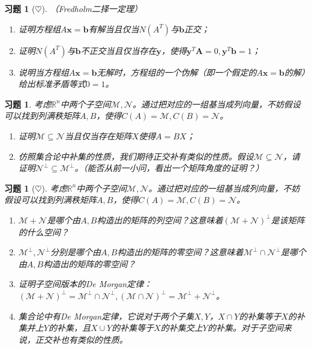 \documentclass[UTF8]{ctexart}
\newcommand{\Ker}{N}
\newtheorem{ex}[thm]{习题}
\begin{document}
\begin{ex}[$\heartsuit$]
（Fredholm二择一定理）
\begin{enumerate}
\item 证明方程组$A\bm x=\bm b$有解当且仅当$\Ker(A^T)$与$\bm b$正交；
\item 证明$\Ker(A^T)$与$\bm b$不正交当且仅当存在$\bm y$，使得$\bm y^T \bm A =0, \bm y^T \bm b =1$；
\item 说明当方程组$A\bm x=\bm b$无解时，方程组的一个伪解（即一个假定的$A\bm x=\bm b$的解）给出标准矛盾等式$0=1$。

\end{enumerate}
\end{ex}



\begin{ex}
考虑$\mathbb{R}^n$中两个子空间$\mathcal{M},\mathcal{N}$。通过把对应的一组基当成列向量，不妨假设可以找到列满秩矩阵$A,B$，使得$C(A)=\mathcal{M}, C(B)=\mathcal{N}$。
\begin{enumerate}
\item 证明$\mathcal{M}\subseteq\mathcal{N}$当且仅当存在矩阵$X$使得$A=BX$；
\item 仿照集合论中补集的性质，我们期待正交补有类似的性质。假设$\mathcal{M}\subseteq\mathcal{N}$，请证明$\mathcal{N}^\perp\subseteq\mathcal{M}^\perp$。（能否从前一小问，看出一个矩阵角度的证明？）
\end{enumerate}
\end{ex}



\begin{ex}[$\heartsuit $]
考虑$\mathbb{R}^n$中两个子空间$\mathcal{M},\mathcal{N}$。通过把对应的一组基当成列向量，不妨假设可以找到列满秩矩阵$A,B$，使得$C(A)=\mathcal{M}, C(B)=\mathcal{N}$。
\begin{enumerate}
\item $\mathcal{M}+\mathcal{N}$是哪个由$A,B$构造出的矩阵的列空间？这意味着$(\mathcal{M}+\mathcal{N})^\perp$是该矩阵的什么空间？
\item $\mathcal{M}^\perp,\mathcal{N}^\perp$分别是哪个由$A,B$构造出的矩阵的零空间？这意味着$\mathcal{M}^\perp\cap\mathcal{N}^\perp$是哪个由$A,B$构造出的矩阵的零空间？
\item 证明子空间版本的De Morgan定律：$(\mathcal{M}+\mathcal{N})^\perp=\mathcal{M}^\perp\cap\mathcal{N}^\perp,(\mathcal{M}\cap\mathcal{N})^\perp=\mathcal{M}^\perp+\mathcal{N}^\perp$。
\item[注记:] 集合论中有De Morgan定律，它说对于两个子集$X,Y$，$X\cap Y$的补集等于$X$的补集并上$Y$的补集，且$X\cup Y$的补集等于$X$的补集交上$Y$的补集。对于子空间来说，正交补也有类似的性质。
\end{enumerate}
\end{ex}
\end{document}
